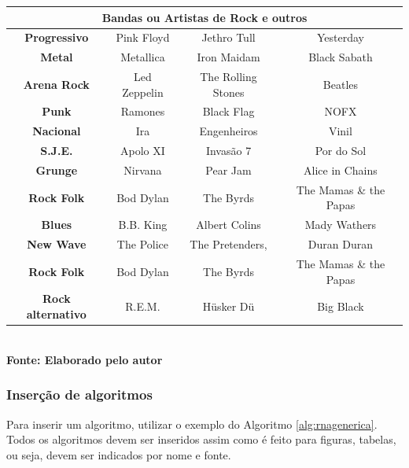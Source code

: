    	\begin{quadro}[H]
   		\centering
   		\caption{Bandas/Artistas de Rock e outros}
   	\label{qua:quadro1}
	\begin{tabular}{|c|c|c|c|} \hline
	\multicolumn{4}{|c|}{\textbf{Bandas ou Artistas de Rock e outros}} 	  \\ 
		\hline \textbf{	Progressivo} & Pink Floyd & Jethro Tull	& Yesterday \\ 
		 \hline \textbf{ Metal}  & Metallica & Iron Maidam & Black Sabath \\ 
		\hline \textbf{	Arena Rock} & Led Zeppelin & The Rolling Stones & Beatles \\ 
		\hline \textbf{ Punk} & Ramones & Black Flag & NOFX	\\ 
		\hline \textbf{	Nacional} & Ira & Engenheiros & Vinil	\\ 
		\hline \textbf{	S.J.E.} & Apolo XI & Invasão 7 & Por do Sol \\ 
		\hline \textbf{	Grunge} & Nirvana & Pear Jam & Alice in Chains	\\ 
		\hline \textbf{	Rock Folk} & Bod Dylan & The Byrds &  The Mamas \& the Papas \\
		\hline \textbf{	Blues} & B.B. King & Albert Colins & Mady Wathers \\ 
		\hline \textbf{	New Wave} & The Police & The Pretenders, &  Duran Duran\\ 
 		\hline \textbf{	Rock Folk} & Bod Dylan & The Byrds &  The Mamas \& the Papas \\
 		\hline \textbf{	Rock alternativo} & R.E.M.& Hüsker Dü & Big Black\\ 
		\hline
	\end{tabular}
	\vspace{.1cm}  %
	\small
	{\footnotesize\\ \textbf{Fonte: Elaborado pelo autor}}
   \end{quadro}

   
\estrutura\subsubsection{\esp Inserção de algoritmos}\instrucao

Para inserir um algoritmo, utilizar o exemplo do Algoritmo  \ref{alg:rnagenerica}.
Todos os algoritmos devem ser inseridos assim como é feito para figuras, tabelas, ou seja, devem ser indicados por nome e fonte.


